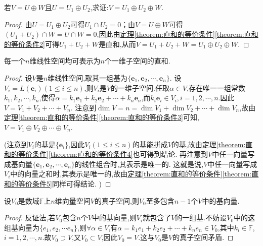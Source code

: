 \documentclass[../../main.tex]{subfiles}
\begin{document}
\begin{proposition}\label{proposition:直和的传递性}
若\(V = U\oplus W\)且\(U = U_1\oplus U_2\),求证:\(V = U_1\oplus U_2\oplus W\). 
\end{proposition}
\begin{proof}
由\(U = U_1\oplus U_2\)可得\(U_1\cap U_2 = 0\)；由\(V = U\oplus W\)可得\((U_1 + U_2)\cap W=U\cap W = 0\),因此由\hyperref[theorem:直和的等价条件2]{定理\ref{theorem:直和的等价条件}\ref{theorem:直和的等价条件2}}可得\(U_1 + U_2+W\)是直和,从而\(V = U_1 + U_2+W = U_1\oplus U_2\oplus W\).
\end{proof}

\begin{proposition}\label{proposition:n维线性空间的一维直和分解}
每一个\(n\)维线性空间均可表示为\(n\)个一维子空间的直和.
\end{proposition}
\begin{proof}
设\(V\)是\(n\)维线性空间,取其一组基为\(\{\boldsymbol{e}_1,\boldsymbol{e}_2,\cdots,\boldsymbol{e}_n\}\). 设\(V_i = L(\boldsymbol{e}_i)(1\leq i\leq n)\),则\(V_i\)是\(V\)的一维子空间.任取$\alpha\in V$,存在唯一一组常数$k_1,k_2,\cdots,k_n$,使得$\alpha =k_1\boldsymbol{e}_1+k_2\boldsymbol{e}_2+\cdots +k_n\boldsymbol{e}_n$,而$k_i\boldsymbol{e}_i\in V_i,i=1,2,\cdots ,n.$因此\(V = V_1 + V_2+\cdots+V_n\). 注意到\(\dim V = n=\dim V_1+\dim V_2+\cdots+\dim V_n\),故由\hyperref[theorem:直和的等价条件3]{定理\ref{theorem:直和的等价条件}\ref{theorem:直和的等价条件3}}可知,\(V = V_1\oplus V_2\oplus\cdots\oplus V_n\). 

(注意到\(V_i\)的基是\(\{\boldsymbol{e}_i\}\),因此\(V_i(1\leq i\leq n)\)的基能拼成\(V\)的基,故由\hyperref[theorem:直和的等价条件4]{定理\ref{theorem:直和的等价条件}\ref{theorem:直和的等价条件4}}也可得到结论. 再注意到\(V\)中任一向量写成基向量\(\{\boldsymbol{e}_1,\boldsymbol{e}_2,\cdots,\boldsymbol{e}_n\}\)的线性组合时,其表示是唯一的. 这就是说,\(V\)中任一向量写成\(V_i\)中的向量之和时,其表示是唯一的,故由\hyperref[theorem:直和的等价条件5]{定理\ref{theorem:直和的等价条件}\ref{theorem:直和的等价条件5}}同样可得结论. )
\end{proof}

\begin{proposition}\label{proposition:真子空间至多包含n-1个基向量}
设\(V_0\)是数域\(\mathbb{F}\)上$n$维向量空间\(V\)的真子空间,则\(V_0\)至多包含$n-1$个$V$中的基向量.
\end{proposition}
\begin{proof}
反证法,若$V_0$包含\(n\)个\(V\)中的基向量,则$V_i$就包含了$V$的一组基.不妨设$V_0$中的这组基向量为$\{e_1,e_2,\cdots e_n\}$,则$\forall \alpha\in V$,有$\alpha =k_1e_1+k_2e_2+\cdots +k_ne_n \in V_0$,其中$k_i\in \mathbb{F}$,$i=1,2,\cdots,n$.故$V_0\supset V$,又$V_0\subset V$,因此$V_0=V$.这与\(V_0\)是\(V\)的真子空间矛盾.
\end{proof}
\end{document}
